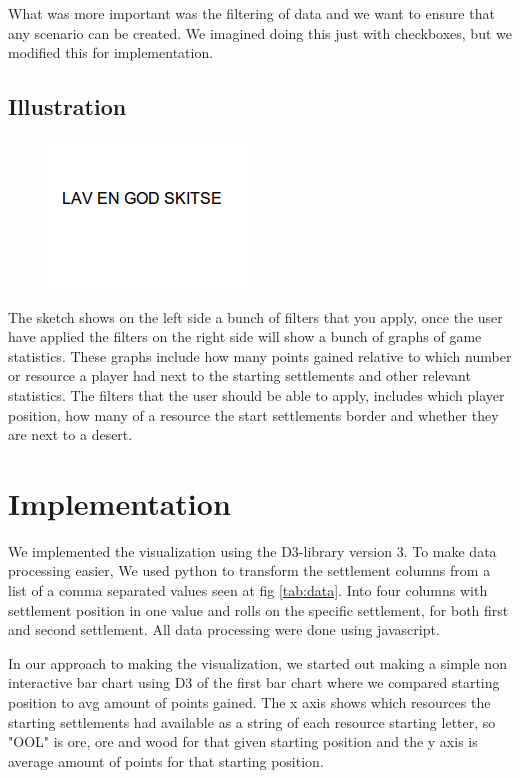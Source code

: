 \documentclass[journal]{vgtc}                %
\begin{document}
What was more important was the filtering of data and we want to ensure that
any scenario can be created. We imagined doing this just with checkboxes, but
we modified this for implementation.

\subsection{Illustration}
\begin{figure}[!h]
  \centering
  \includegraphics[scale=0.4]{pic2.png}
\end{figure}
\noindent
The sketch shows on the left side a bunch of filters that you apply, once the
user have applied the filters on the right side will show a bunch of graphs
of game statistics. These graphs include how many points gained relative to
which number or resource a player had next to the starting settlements and
other relevant statistics. The filters that the user should be able to apply,
includes which player position, how many of a resource the start settlements
border and whether they are next to a desert.

\section{Implementation}

We implemented the visualization using the D3-library version 3. To make
data processing easier, We used python to transform the settlement columns
from a list of a comma separated values seen at fig \ref{tab:data}. Into
four columns with settlement position in one value and rolls on the specific
settlement, for both first and second settlement. All data processing were
done using javascript.

In our approach to making the visualization, we started out making a simple non
interactive bar chart using D3 of the first bar chart where we compared starting position to avg amount of points gained.
The x axis shows which resources the starting settlements had available as a string of each resource starting letter,
so "OOL" is ore, ore and wood for that given starting position and the y axis is average amount of points for that starting position.
\end{document}
